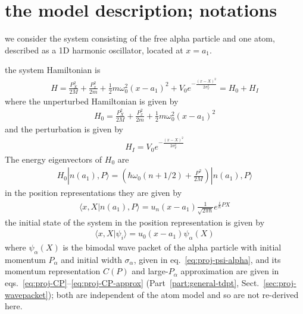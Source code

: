 \section{the model description; notations}
\label{sec:osc-one-absorber}
we consider the system consisting of the free alpha particle and one atom, described as a 1D harmonic oscillator, located at $x=a_1$.

the system Hamiltonian is
\begin{align}
  H=\frac{P_X^2}{2M}+\frac{P_x^2}{2m}+\frac{1}{2}m\omega_0^2(x-a_1)^2+V_0e^{-\frac{(x-X)^2}{2\sigma_V^2}}=H_0+H_I
\end{align}
where the unperturbed Hamiltonian is given by
\begin{align}
  H_0=\frac{P_X^2}{2M}+\frac{P_x^2}{2m}+\frac{1}{2}m\omega_0^2(x-a_1)^2
\end{align}
and the perturbation is given by
\begin{align}
  H_I=V_0e^{-\frac{(x-X)^2}{2\sigma_V^2}}
\end{align}
The energy eigenvectors of $H_0$ are
\begin{align}
  H_0|n(a_1),P\rangle = (\hbar\omega_0(n+1/2)+\frac{P^2}{2M})|n(a_1),P\rangle
\end{align}
in the position representations they are given by
\begin{align}
  \langle x,X|n(a_1),P\rangle = u_n(x-a_1)\frac{1}{\sqrt{2\pi\hbar}}e^{\frac{i}{\hbar}PX}
\end{align}
the initial state of the system in the position representation is given by
\begin{align}
  \langle x,X|\psi_i\rangle = u_0(x-a_1) \psi_\alpha(X)
\end{align}
where $\psi_\alpha(X)$ is the bimodal wave packet of the alpha particle with initial momentum $P_\alpha$ and initial width $\sigma_\alpha$, given in eq.~\eqref{eq:proj-psi-alpha}, and its momentum representation $C(P)$ and large-$P_\alpha$ approximation are given in eqs.~\eqref{eq:proj-CP}--\eqref{eq:proj-CP-approx} (Part~\ref{part:general-tdpt}, Sect.~\ref{sec:proj-wavepacket}); both are independent of the atom model and so are not re-derived here.

